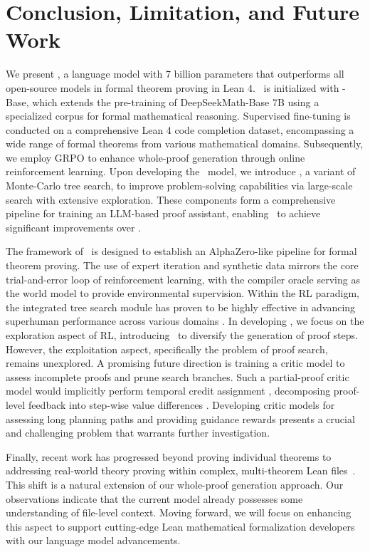 \section{Conclusion, Limitation, and Future Work}

We present \thiswork, a language model with 7 billion parameters that outperforms all open-source models in formal theorem proving in Lean 4.
\thiswork~is initialized with \thiswork-Base, which extends the pre-training of DeepSeekMath-Base 7B using a specialized corpus for formal mathematical reasoning.
Supervised fine-tuning is conducted on a comprehensive Lean 4 code completion dataset, encompassing a wide range of formal theorems from various mathematical domains.
Subsequently, we employ GRPO to enhance whole-proof generation through online reinforcement learning.
Upon developing the \thiswork~model, we introduce \treesearch, a variant of Monte-Carlo tree search, to improve problem-solving capabilities via large-scale search with extensive exploration.
These components form a comprehensive pipeline for training an LLM-based proof assistant, enabling \thiswork~to achieve significant improvements over \lastwork.

The framework of \thiswork~is designed to establish an AlphaZero-like pipeline for formal theorem proving.
The use of expert iteration and synthetic data mirrors the core trial-and-error loop of reinforcement learning, with the compiler oracle serving as the world model to provide environmental supervision.
Within the RL paradigm, the integrated tree search module has proven to be highly effective in advancing superhuman performance across various domains \citep{silver2016mastering, fawzi2022discovering, lutz2023top}.
In developing \thiswork, we focus on the exploration aspect of RL, introducing \treesearch~to diversify the generation of proof steps.
However, the exploitation aspect, specifically the problem of proof search, remains unexplored.
A promising future direction is training a critic model to assess incomplete proofs and prune search branches.
Such a partial-proof critic model would implicitly perform temporal credit assignment \citep{sutton1984temporal}, decomposing proof-level feedback into step-wise value differences \citep{arjona2019rudder}.
Developing critic models for assessing long planning paths and providing guidance rewards presents a crucial and challenging problem \citep{ng2000algorithms, sorg2010reward} that warrants further investigation.

Finally, recent work has progressed beyond proving individual theorems to addressing real-world theory proving within complex, multi-theorem Lean files~\citep{hu2024minictx}. This shift is a natural extension of our whole-proof generation approach. Our observations indicate that the current model already possesses some understanding of file-level context. Moving forward, we will focus on enhancing this aspect to support cutting-edge Lean mathematical formalization developers with our language model advancements.